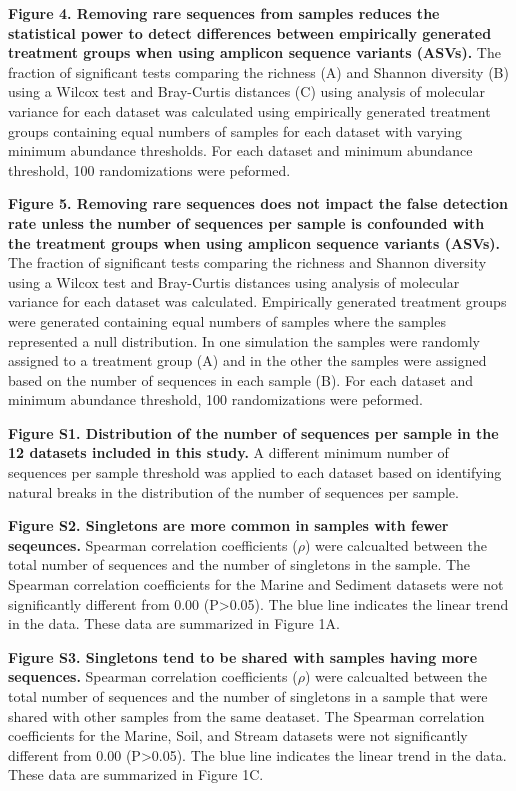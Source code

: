 \documentclass[
]{article}
\begin{document}
\textbf{Figure 4. Removing rare sequences from samples reduces the
statistical power to detect differences between empirically generated
treatment groups when using amplicon sequence variants (ASVs).} The
fraction of significant tests comparing the richness (A) and Shannon
diversity (B) using a Wilcox test and Bray-Curtis distances (C) using
analysis of molecular variance for each dataset was calculated using
empirically generated treatment groups containing equal numbers of
samples for each dataset with varying minimum abundance thresholds. For
each dataset and minimum abundance threshold, 100 randomizations were
peformed.

\textbf{Figure 5. Removing rare sequences does not impact the false
detection rate unless the number of sequences per sample is confounded
with the treatment groups when using amplicon sequence variants (ASVs).}
The fraction of significant tests comparing the richness and Shannon
diversity using a Wilcox test and Bray-Curtis distances using analysis
of molecular variance for each dataset was calculated. Empirically
generated treatment groups were generated containing equal numbers of
samples where the samples represented a null distribution. In one
simulation the samples were randomly assigned to a treatment group (A)
and in the other the samples were assigned based on the number of
sequences in each sample (B). For each dataset and minimum abundance
threshold, 100 randomizations were peformed.

\newpage

\textbf{Figure S1. Distribution of the number of sequences per sample in
the 12 datasets included in this study.} A different minimum number of
sequences per sample threshold was applied to each dataset based on
identifying natural breaks in the distribution of the number of
sequences per sample.

\textbf{Figure S2. Singletons are more common in samples with fewer
seqeunces.} Spearman correlation coefficients (\(\rho\)) were calcualted
between the total number of sequences and the number of singletons in
the sample. The Spearman correlation coefficients for the Marine and
Sediment datasets were not significantly different from 0.00
(P\textgreater0.05). The blue line indicates the linear trend in the
data. These data are summarized in Figure 1A.

\textbf{Figure S3. Singletons tend to be shared with samples having more
sequences.} Spearman correlation coefficients (\(\rho\)) were calcualted
between the total number of sequences and the number of singletons in a
sample that were shared with other samples from the same deataset. The
Spearman correlation coefficients for the Marine, Soil, and Stream
datasets were not significantly different from 0.00 (P\textgreater0.05).
The blue line indicates the linear trend in the data. These data are
summarized in Figure 1C.
\end{document}
